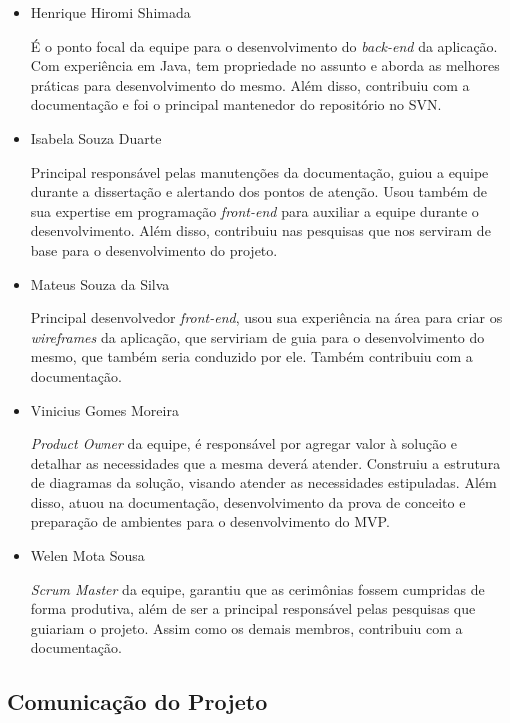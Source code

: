 		\begin{itemize}
			\item 
				Henrique Hiromi Shimada
				
				É o ponto focal da equipe para o desenvolvimento do \textit{back-end} da aplicação. Com experiência em Java, tem propriedade no assunto e aborda as melhores práticas para desenvolvimento do mesmo. Além disso, contribuiu com a documentação e foi o principal mantenedor do repositório no SVN.
                
			\item 
				Isabela Souza Duarte
				
                Principal responsável pelas manutenções da documentação, guiou a equipe durante a dissertação e alertando dos pontos de atenção. Usou também de sua expertise em programação \textit{front-end} para auxiliar a equipe durante o desenvolvimento.  Além disso, contribuiu nas pesquisas que nos serviram de base para o desenvolvimento do projeto.

			\item 
				Mateus Souza da Silva

                Principal desenvolvedor \textit{front-end}, usou sua experiência na área para criar os \textit{wireframes} da aplicação, que serviriam de guia para o desenvolvimento do mesmo, que também seria conduzido por ele. Também contribuiu com a documentação.

			\item 
				Vinicius Gomes Moreira
                
                \textit{Product Owner} da equipe, é responsável por agregar valor à solução e detalhar as necessidades que a mesma deverá atender. Construiu a estrutura de diagramas da solução, visando atender as necessidades estipuladas. Além disso, atuou na documentação, desenvolvimento da prova de conceito e preparação de ambientes para o desenvolvimento do MVP. 
                


			\item 
				Welen Mota Sousa

                \textit{Scrum Master} da equipe, garantiu que as cerimônias fossem cumpridas de forma produtiva, além de ser a principal responsável pelas pesquisas que guiariam o projeto. Assim como os demais membros, contribuiu com a documentação.
				
		\end{itemize}

	\subsection{Comunicação do Projeto}

